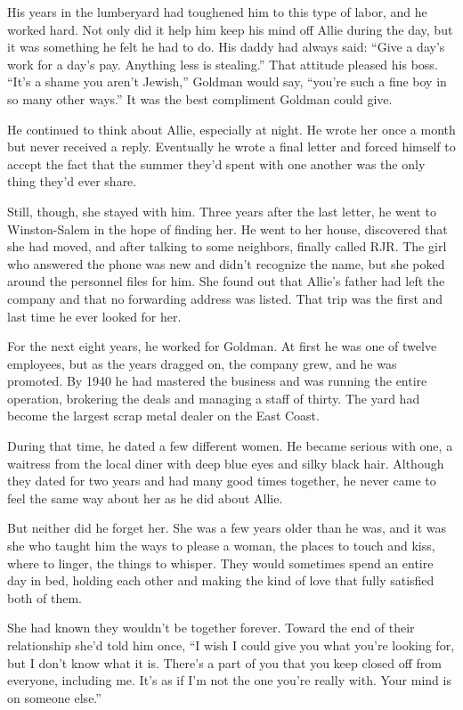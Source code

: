 \documentclass[10pt, twoside, openright]{book}
\begin{document}
His years in the lumberyard had toughened him to this type of labor, and
he worked hard. Not only did it help him keep his mind off Allie during
the day, but it was something he felt he had to do. His daddy had always
said: ``Give a day's work for a day's pay. Anything less is stealing.''
That attitude pleased his boss. ``It's a shame you aren't Jewish,''
Goldman would say, ``you're such a fine boy in so many other ways.'' It
was the best compliment Goldman could give.

He continued to think about Allie, especially at night. He wrote her
once a month but never received a reply. Eventually he wrote a final
letter and forced himself to accept the fact that the summer they'd
spent with one another was the only thing they'd ever share.

Still, though, she stayed with him. Three years after the last letter,
he went to Winston-Salem in the hope of finding her. He went to her
house, discovered that she had moved, and after talking to some
neighbors, finally called RJR. The girl who answered the phone was new
and didn't recognize the name, but she poked around the personnel files
for him. She found out that Allie's father had left the company and that
no forwarding address was listed. That trip was the first and last time
he ever looked for her.

For the next eight years, he worked for Goldman. At first he was one of
twelve employees, but as the years dragged on, the company grew, and he
was promoted. By 1940 he had mastered the business and was running the
entire operation, brokering the deals and managing a staff of thirty.
The yard had become the largest scrap metal dealer on the East Coast.

During that time, he dated a few different women. He became serious with
one, a waitress from the local diner with deep blue eyes and silky black
hair. Although they dated for two years and had many good times
together, he never came to feel the same way about her as he did about
Allie.

But neither did he forget her. She was a few years older than he was,
and it was she who taught him the ways to please a woman, the places to
touch and kiss, where to linger, the things to whisper. They would
sometimes spend an entire day in bed, holding each other and making the
kind of love that fully satisfied both of them.

She had known they wouldn't be together forever. Toward the end of their
relationship she'd told him once, ``I wish I could give you what you're
looking for, but I don't know what it is. There's a part of you that you
keep closed off from everyone, including me. It's as if I'm not the one
you're really with. Your mind is on someone else.''
\end{document}
